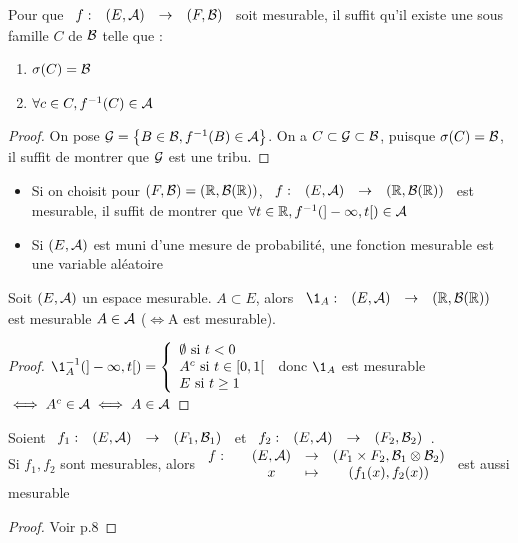 \documentclass[]{report}
\begin{document}
\begin{prop}
    Pour que $\begin{array}{ccccc} f : & (E,\mathcal{A}) & \to & (F,\mathcal{B}) \end{array}$ soit mesurable, il suffit qu'il existe une sous famille $C$ de $\mathcal{B}$ telle que : \begin{enumerate}
        \item $\sigma(C)=\mathcal{B}$
        \item $\forall c\in C,f^{-1}(C)\in\mathcal{A}$
    \end{enumerate}
\end{prop}

\begin{proof}
    On pose $\mathcal{G}=\left\{ B\in\mathcal{B},f^{-1}(B)\in\mathcal{A} \right\}$. On a $C\subset\mathcal{G}\subset\mathcal{B}$, puisque $\sigma(C)=\mathcal{B}$, il suffit de montrer que $\mathcal{G}$ est une tribu.
\end{proof}

\begin{ex}
    \begin{itemize}
        \item Si on choisit pour $(F,\mathcal{B})=(\mathbb{R},\mathcal{B}(\mathbb{R}))$, $\begin{array}{ccccc} f : & (E,\mathcal{A}) & \to & (\mathbb{R},\mathcal{B}(\mathbb{R})) \end{array}$ est mesurable, il suffit de montrer que $\forall t\in\mathbb{R},f^{-1}(]-\infty,t[)\in\mathcal{A}$
        \item Si $(E,\mathcal{A})$ est muni d'une mesure de probabilité, une fonction mesurable est une variable aléatoire
        \end{itemize}
\end{ex}

\begin{prop}
    Soit $(E,\mathcal{A})$ un espace mesurable. $A\subset E$, alors $\funto{\1_A}{(E,\Ar)}{\RBR}$ est mesurable \ssi $A\in\mathcal{A}$ ($\iff$A est mesurable).
\end{prop}

\begin{proof}
    $\1_A^{-1}(]-\infty,t[)=\cho{\emptyset\text{ si }t<0\\
    A^c\text{ si }t\in[0,1[\\
    E\text{ si }t\ge 1}$ donc $\1_A$ est mesurable$\iff A^c\in\mathcal{A}\iff A\in \mathcal{A}$
\end{proof}

\begin{prop}
    Soient $\begin{array}{ccccc} f_1 : & (E,\mathcal{A}) & \to & (F_1,\mathcal{B}_1) \end{array}$ et $\begin{array}{ccccc} f_2 : & (E,\mathcal{A}) & \to & (F_2,\mathcal{B}_2) \end{array}$.\\
    Si $f_1,f_2$ sont mesurables, alors $\begin{array}{ccccc} f : & & (E,\mathcal{A}) & \to & (F_1\times F_2,\mathcal{B}_1\otimes\mathcal{B}_2) \\ & & x & \mapsto & (f_1(x),f_2(x)) \end{array}$ est aussi mesurable
\end{prop}

\begin{proof}
    Voir p.8
\end{proof}
\end{document}
